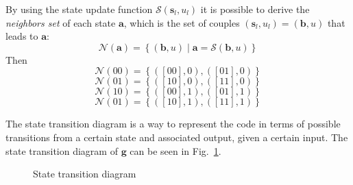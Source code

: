 \documentclass[10pt]{article}
\newcommand{\SU}[1] {\mathcal{S}(#1)}
\newcommand{\s} {\mathbf{s}}
\begin{document}

By using the state update function $\SU{\s_l, u_l}$ it is possible to derive the \emph{neighbors set} of each state $\mathbf{a}$, which is the set of couples $(\s_l, u_l) = (\mathbf{b}, u)$ that leads to $\mathbf{a}$:
\begin{equation}
	\mathcal{N}(\mathbf{a}) = \left\{ (\mathbf{b}, u) \middle| \mathbf{a} = \SU{\mathbf{b}, u} \right\} 
\end{equation}
Then
\begin{equation}
	\mathcal{N}(00) = \left\{ ([00], 0), ([01], 0) \right\} 
\end{equation}
\begin{equation*}
	\mathcal{N}(01) = \left\{ ([10], 0), ([11], 0) \right\} 
\end{equation*}
\begin{equation*}
	\mathcal{N}(10) = \left\{ ([00], 1), ([01], 1) \right\} 
\end{equation*}
\begin{equation*}
	\mathcal{N}(01) = \left\{ ([10], 1), ([11], 1) \right\} 
\end{equation*}

The state transition diagram is a way to represent the code in terms of possible transitions from a certain state and associated output, given a certain input. The state transition diagram of $\mathbf{g}$ can be seen in Fig.~\ref{fig:state}.

\begin{figure}
\centering
{}
\caption{State transition diagram}
\label{fig:state}
\end{figure}
\end{document}
